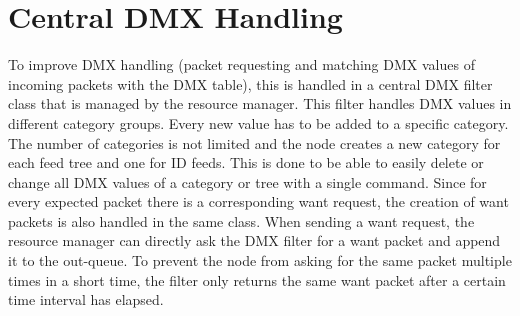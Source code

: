 \section{Central DMX Handling}
To improve DMX handling (packet requesting and matching DMX values of incoming packets with the DMX table), this is handled in a central DMX filter class that is managed by the resource manager. This filter handles DMX values in different category groups. Every new value has to be added to a specific category. The number of categories is not limited and the node creates a new category for each feed tree and one for ID feeds. This is done to be able to easily delete or change all DMX values of a category or tree with a single command. Since for every expected packet there is a corresponding want request, the creation of want packets is also handled in the same class. When sending a want request, the resource manager can directly ask the DMX filter for a want packet and append it to the out-queue. To prevent the node from asking for the same packet multiple times in a short time, the filter only returns the same want packet after a certain time interval has elapsed.